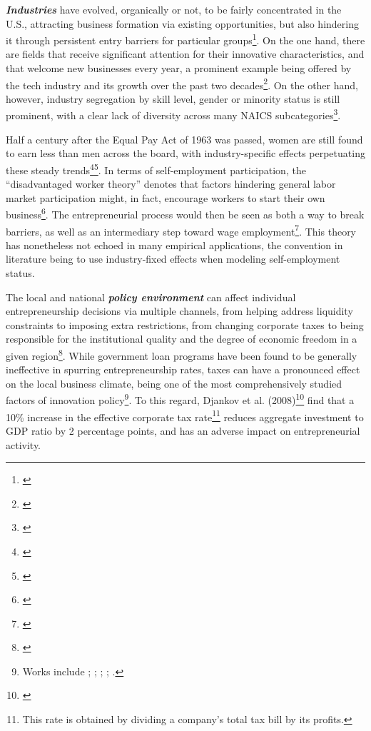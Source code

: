 \textit{\textbf{Industries}} have evolved, organically or not, to be fairly concentrated in the U.S., attracting business formation via existing opportunities, but also hindering it through persistent entry barriers for particular groups\footnote{\cite{ChatterjiGlaeserKerr2014}}. On the one hand, there are fields that receive significant attention for their innovative characteristics, and that welcome new businesses every year, a prominent example being offered by the tech industry and its growth over the past two decades\footnote{\cite{Berman2014}}. On the other hand, however,  industry segregation by skill level, gender or minority status is still prominent, with a clear lack of diversity across many NAICS subcategories\footnote{\cite{cartwright2011job}}. 

Half a century after the Equal Pay Act of 1963 was passed, women are still found to earn less than men across the board, with industry-specific effects perpetuating these steady trends\footnote{\cite{corbett2012graduating}}\hspace{.15em}\footnote{\cite{cartwright2011job}}. In terms of self-employment participation, the ``disadvantaged worker theory'' denotes that factors hindering general labor market participation might, in fact, encourage workers to start their own business\footnote{\cite{PatrickStephensWeinstein2016}}. The entrepreneurial process would then be seen as both a way to break barriers, as well as an intermediary step toward wage employment\footnote{\cite{PatrickStephensWeinstein2016}}. This theory has nonetheless not echoed in many empirical applications, the convention in literature being to use industry-fixed effects when modeling self-employment status.

The local and national \textbf{\textit{policy environment}} can affect individual entrepreneurship decisions via multiple channels, from helping address liquidity constraints to imposing extra restrictions, from changing corporate taxes to being responsible for the institutional quality and the degree of economic freedom in a given region\footnote{\cite{Williams2013}}. While government loan programs have been found to be generally ineffective in spurring entrepreneurship rates, taxes can have a pronounced effect on the local business climate, being one of the most comprehensively studied factors of innovation policy\footnote{Works include \cite{CullenGordon2006}; \cite{DjankovGanserMcLieshRamalhoShleifer2008}; \cite{Goetz2008}; \cite{Lerner2009}; \cite{Williams2013}.}. To this regard, Djankov et al. (2008)\footnote{\cite{DjankovGanserMcLieshRamalhoShleifer2008}} find that a 10\% increase in the effective corporate tax rate\footnote{ This rate is obtained by dividing a company's total tax bill by its profits.} reduces aggregate investment to GDP ratio by 2 percentage points, and has an adverse impact on entrepreneurial activity. 

